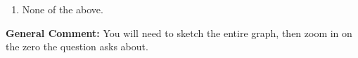 \documentclass{extbook}[14pt]
\begin{document}
\begin{enumerate}
{\begin{enumerate}[label=\Alph*.]
\item None of the above.\end{enumerate}
\textbf{General Comment:} You will need to sketch the entire graph, then zoom in on the zero the question asks about.
}
\end{enumerate}
\end{document}
